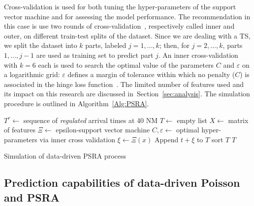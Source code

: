 \documentclass[final,review]{elsarticle}
\begin{document}
Cross-validation is used for both tuning the hyper-parameters of the support vector machine and for assessing the model performance. The recommendation in this case is use two rounds of cross-validation~\citep{cawley2010over}, respectively called inner and outer, on different train-test splits of the dataset. Since we are dealing with a TS, we split the dataset into $k$ parts, labeled $j = 1,\ldots,k$; then, for $j = 2, \dots, k$, parts $1, \ldots, j-1$ are used as training set to predict part $j$.
An inner cross-validation with $k = 6$ each is used to search the optimal value of the parameters \(C\) and \(\varepsilon\) on a logarithmic grid:
\(\varepsilon\) defines a margin of tolerance within which no penalty (\(C\)) is associated in the hinge loss function~\citep{rosasco2004loss}.
The limited number of features used and its impact on this research are discussed in~Section~\ref{sec:analysis}.
The simulation procedure is outlined in Algorithm~\ref{Alg:PSRA}.

\begin{algorithm}
\begin{algorithmic}[1]
    \STATE \(T^{r} \leftarrow \) sequence of \emph{regulated} arrival times at 40 NM
    \STATE \(T \leftarrow \) empty list
    \STATE \(X \leftarrow \) matrix of features
    \STATE \(\Xi \leftarrow \) epsilon-support vector machine
    \STATE \(C, \varepsilon \leftarrow \) optimal hyper-parameters via inner cross validation
        \STATE \(\xi \leftarrow \Xi(x)\)
        \STATE Append \(t + \xi\) to \(T\)
    \ENDFOR
    \STATE sort \(T\)
    \RETURN \(T\)
\end{algorithmic}
\caption{Simulation of data-driven PSRA process}\label{Alg:PSRA}
\end{algorithm}

\subsection{Prediction capabilities of data-driven Poisson and \acs{PSRA}}\label{sec:dm_comparison}
\end{document}
